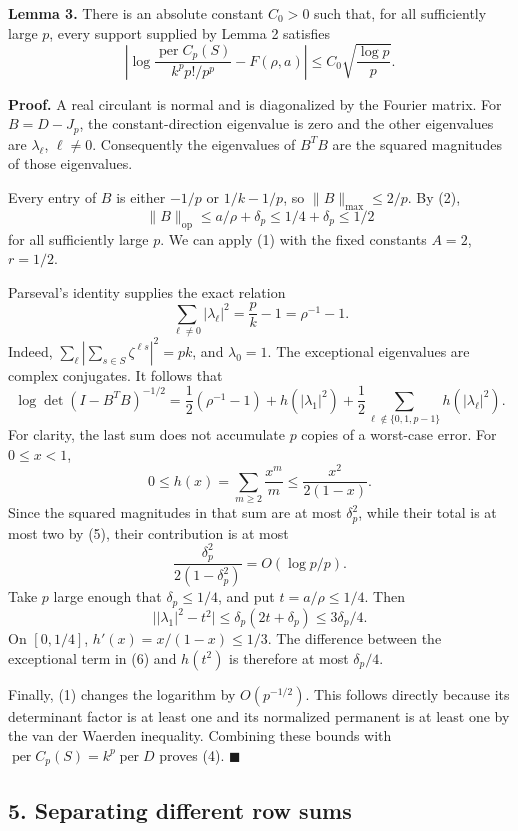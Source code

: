 \documentclass[
  11pt,
]{article}
\begin{document}
\textbf{Lemma 3.} There is an absolute constant \(C_0>0\) such that, for
all sufficiently large \(p\), every support supplied by Lemma 2
satisfies \[
 \left|\log\frac{\operatorname{per}C_p(S)}{k^p p!/p^p}
             -F(\rho,a)\right|
 \le C_0\sqrt{\frac{\log p}{p}}.                            \tag{4}
\]

\textbf{Proof.} A real circulant is normal and is diagonalized by the
Fourier matrix. For \(B=D-J_p\), the constant-direction eigenvalue is
zero and the other eigenvalues are \(\lambda_\ell\), \(\ell\ne0\).
Consequently the eigenvalues of \(B^TB\) are the squared magnitudes of
those eigenvalues.

Every entry of \(B\) is either \(-1/p\) or \(1/k-1/p\), so
\(\|B\|_{\max}\le2/p\). By (2), \[
 \|B\|_{\mathrm{op}}\le a/\rho+\delta_p\le1/4+\delta_p\le1/2
\] for all sufficiently large \(p\). We can apply (1) with the fixed
constants \(A=2\), \(r=1/2\).

Parseval's identity supplies the exact relation \[
 \sum_{\ell\ne0}|\lambda_\ell|^2=\frac pk-1=\rho^{-1}-1.       \tag{5}
\] Indeed, \(\sum_\ell|\sum_{s\in S}\zeta^{\ell s}|^2=pk\), and
\(\lambda_0=1\). The exceptional eigenvalues are complex conjugates. It
follows that \[
 \log\det(I-B^TB)^{-1/2}
 =\frac12(\rho^{-1}-1)+h(|\lambda_1|^2)
       +\frac12\sum_{\ell\notin\{0,1,p-1\}}h(|\lambda_\ell|^2). \tag{6}
\] For clarity, the last sum does not accumulate \(p\) copies of a
worst-case error. For \(0\le x<1\), \[
 0\le h(x)=\sum_{m\ge2}\frac{x^m}{m}
       \le\frac{x^2}{2(1-x)}.
\] Since the squared magnitudes in that sum are at most \(\delta_p^2\),
while their total is at most two by (5), their contribution is at most
\[
 \frac{\delta_p^2}{2(1-\delta_p^2)}=O(\log p/p).             \tag{7}
\] Take \(p\) large enough that \(\delta_p\le1/4\), and put
\(t=a/\rho\le1/4\). Then \[
 \bigl||\lambda_1|^2-t^2\bigr|
 \le\delta_p(2t+\delta_p)\le3\delta_p/4.
\] On \([0,1/4]\), \(h'(x)=x/(1-x)\le1/3\). The difference between the
exceptional term in (6) and \(h(t^2)\) is therefore at most
\(\delta_p/4\).

Finally, (1) changes the logarithm by \(O(p^{-1/2})\). This follows
directly because its determinant factor is at least one and its
normalized permanent is at least one by the van der Waerden inequality.
Combining these bounds with
\(\operatorname{per}C_p(S)=k^p\operatorname{per}D\) proves (4).
\(\blacksquare\)

\subsection{5. Separating different row
sums}\label{separating-different-row-sums}
\end{document}
